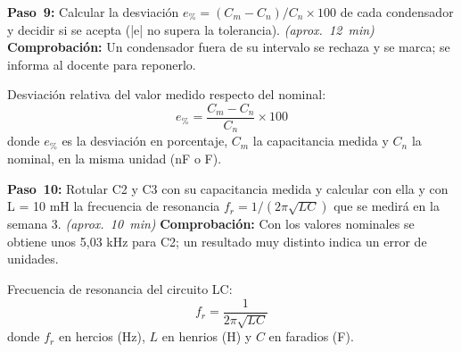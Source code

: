 \documentclass[12pt]{article}
\begin{document}
\begin{pasos}
  \item \textbf{Paso~9:} Calcular la desviación $e_{\text{\%}} = (C_m - C_n)/C_n \times 100$ de cada condensador y decidir si se acepta (|e| no supera la tolerancia). \emph{(aprox.~\SI{12}{\minute})} \textbf{Comprobación:} Un condensador fuera de su intervalo se rechaza y se marca; se informa al docente para reponerlo.
\par Desviación relativa del valor medido respecto del nominal:
\begin{equation}
  e_{\text{\%}} = \frac{C_m - C_n}{C_n} \times 100
  \label{eq:paso-9}
\end{equation}
donde $e_{\text{\%}}$ es la desviación en porcentaje, $C_m$ la capacitancia medida y $C_n$ la nominal, en la misma unidad (nF o \textmu{}F).
  \item \textbf{Paso~10:} Rotular C2 y C3 con su capacitancia medida y calcular con ella y con L = 10 mH la frecuencia de resonancia $f_r = 1/(2\pi\sqrt{LC})$ que se medirá en la semana 3. \emph{(aprox.~\SI{10}{\minute})} \textbf{Comprobación:} Con los valores nominales se obtiene unos 5,03 kHz para C2; un resultado muy distinto indica un error de unidades.
\par Frecuencia de resonancia del circuito LC:
\begin{equation}
  f_r = \frac{1}{2\pi\sqrt{L C}}
  \label{eq:paso-10}
\end{equation}
donde $f_r$ en hercios (Hz), $L$ en henrios (H) y $C$ en faradios (F).
\end{pasos}
\end{document}
